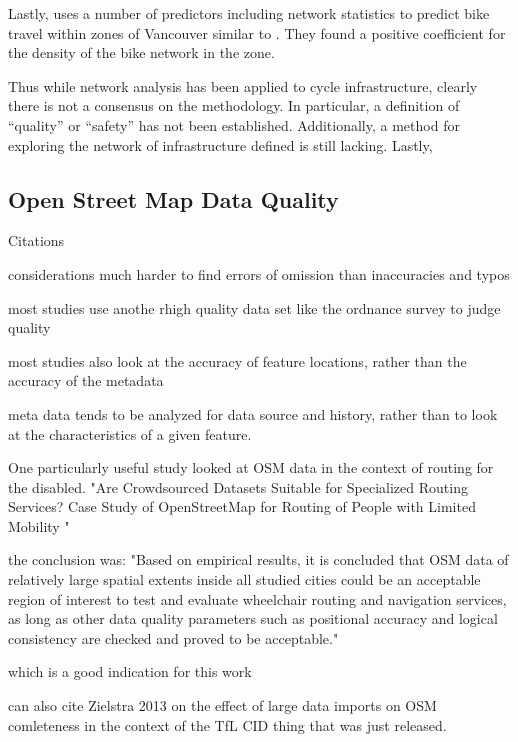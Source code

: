Lastly, \cite{osama2017models} uses a number of predictors including network statistics to predict bike travel within zones of Vancouver similar to \cite{schoner2014missing}. They found a positive coefficient for the density of the bike network in the zone. 

Thus while network analysis has been applied to cycle infrastructure, clearly there is not a consensus on the methodology. In particular, a definition of ``quality'' or ``safety'' has not been established. Additionally, a method for exploring the network of infrastructure defined is still lacking. Lastly,  


\subsection{Open Street Map Data Quality}

Citations

considerations
much harder to find errors of omission than inaccuracies and typos

most studies use anothe rhigh quality data set like the ordnance survey to judge quality

most studies also look at the accuracy of feature locations, rather than the accuracy of the metadata

meta data tends to be analyzed for data source and history, rather than to look at the characteristics of a given feature. 

One particularly useful study looked at OSM data in the context of routing for the disabled. "Are Crowdsourced Datasets Suitable for Specialized Routing Services? Case Study of OpenStreetMap for Routing of People with Limited Mobility "

the conclusion was: "Based on empirical results, it is concluded that OSM data of relatively large spatial extents inside all studied cities could be an acceptable region of interest to test and evaluate wheelchair routing and navigation services, as long as other data quality parameters such as positional accuracy and logical consistency are checked and proved to be acceptable."  

which is a good indication for this work 

can also cite Zielstra 2013 on the effect of large data imports on OSM comleteness in the context of the TfL CID thing that was just released. 